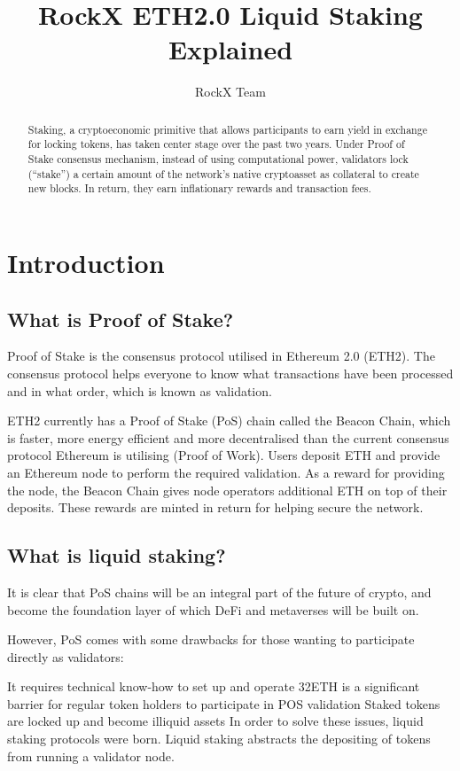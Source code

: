 \documentclass{article}
\title{RockX ETH2.0 Liquid Staking Explained}
\author{RockX Team}
\begin{document}
\maketitle

\begin{abstract}
Staking, a cryptoeconomic primitive that allows participants to earn yield in exchange for locking tokens, has taken center stage over the past two years. Under Proof of Stake consensus mechanism, instead of using computational power, validators lock (“stake”) a certain amount of the network’s native cryptoasset as collateral to create new blocks. In return, they earn inflationary rewards and transaction fees.
\end{abstract}

\section{Introduction}

\subsection{What is Proof of Stake?}

Proof of Stake is the consensus protocol utilised in Ethereum 2.0 (ETH2). The consensus protocol helps everyone to know what transactions have been processed and in what order, which is known as validation.

ETH2 currently has a Proof of Stake (PoS) chain called the Beacon Chain, which is faster, more energy efficient and more decentralised than the current consensus protocol Ethereum is utilising (Proof of Work). Users deposit ETH and provide an Ethereum node to perform the required validation. As a reward for providing the node, the Beacon Chain gives node operators additional ETH on top of their deposits. These rewards are minted in return for helping secure the network.

\subsection{What is liquid staking?}

It is clear that PoS chains will be an integral part of the future of crypto, and become the foundation layer of which DeFi and metaverses will be built on.

However, PoS comes with some drawbacks for those wanting to participate directly as validators:

It requires technical know-how to set up and operate
32ETH is a significant barrier for regular token holders to participate in POS validation
Staked tokens are locked up and become illiquid assets
In order to solve these issues, liquid staking protocols were born. Liquid staking abstracts the depositing of tokens from running a validator node.
\end{document}
